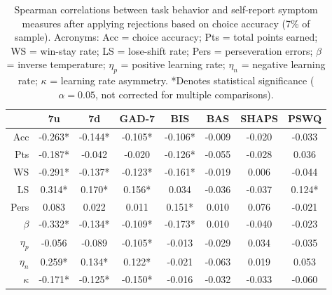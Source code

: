 \documentclass[a4paper,notitlepage,12pt]{article}
\begin{document}
\begin{refsection}[supp]
\begin{table}[H]
\centering
\small
\begin{tabular}{rccccccc}
\toprule
{} &       7u &       7d &    GAD-7 &      BIS &     BAS &   SHAPS &    PSWQ \\
\midrule
Acc      &  -0.263* &  -0.144* &  -0.105* &  -0.106* &  -0.009 &  -0.020 &  -0.033 \\
Pts      &  -0.187* &   -0.042 &   -0.020 &  -0.126* &  -0.055 &  -0.028 &   0.036 \\
WS       &  -0.291* &  -0.137* &  -0.123* &  -0.161* &  -0.019 &   0.006 &  -0.044 \\
LS       &   0.314* &   0.170* &   0.156* &    0.034 &  -0.036 &  -0.037 &  0.124* \\
Pers     &    0.083 &    0.022 &    0.011 &   0.151* &   0.010 &   0.076 &  -0.021 \\
$\beta$  &  -0.332* &  -0.134* &  -0.109* &  -0.173* &   0.010 &  -0.040 &  -0.023 \\
$\eta_p$ &   -0.056 &   -0.089 &  -0.105* &   -0.013 &  -0.029 &   0.034 &  -0.035 \\
$\eta_n$ &   0.259* &   0.134* &   0.122* &   -0.021 &  -0.063 &   0.019 &   0.053 \\
$\kappa$ &  -0.171* &  -0.125* &  -0.150* &   -0.016 &  -0.032 &  -0.033 &  -0.060 \\
\bottomrule
\end{tabular}
\captionsetup{width=0.88\textwidth}
\caption{Spearman correlations between task behavior and self-report symptom measures after applying rejections based on choice accuracy (7\% of sample). Acronyms: Acc = choice accuracy; Pts = total points earned; WS = win-stay rate; LS = lose-shift rate; Pers = perseveration errors; $\beta$ = inverse temperature; $\eta_p$ = positive learning rate; $\eta_n$ = negative learning rate; $\kappa$ = learning rate asymmetry. *Denotes statistical significance ($\alpha=0.05$, not corrected for multiple comparisons).}
\end{table}


\end{refsection}
\end{document}
